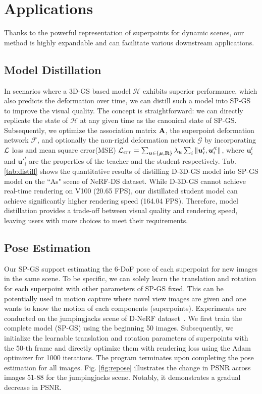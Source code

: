 \section{Applications}
Thanks to the powerful representation of superpoints for dynamic scenes, our method is highly expandable and can facilitate various downstream applications. 
\subsection{Model Distillation}
In scenarios where a 3D-GS based model $\mathcal{H}$ exhibits superior performance, which also predicts the deformation over time, we can distill such a model into SP-GS to improve the visual quality.
The concept is straightforward: we can directly replicate the state of $\mathcal{H}$ at any given time as the canonical state of SP-GS. 
Subsequently, we optimize the association matrix $\mathbf{A}$, the superpoint deformation network $\mathcal{F}$, and optionally the non-rigid deformation network $\mathcal{G}$ by incorporating $\mathcal{L}$ loss and mean square error(MSE) $ \mathcal{L}_{err} =\sum_{\bm{u} \in \{\bm{\mu}, \mathbf{R} \}} \lambda_{\bm{u}} \sum_{i} \|\bm{u}^t_i, \bm{u}'^t_i \|$,
where $\bm{u}^t_i$  and $\bm{u}'^t_i$ are the properties of the teacher and the student respectively.
Tab. \ref{tab:distill} shows the quantitative results of distilling D-3D-GS model into SP-GS model on the ``As" scene of NeRF-DS dataset.
While D-3D-GS cannot achieve real-time rendering on V100 (20.65 FPS), our distillated student model can achieve significantly higher rendering speed (164.04 FPS). Therefore, model distillation provides a trade-off between visual quality and rendering speed, leaving users with more choices to meet their requirements.

\subsection{Pose Estimation}

Our SP-GS support estimating the 6-DoF pose of each superpoint for new images in the same scene.
To be specific, we can solely learn the translation and rotation for each superpoint with other parameters of SP-GS fixed. This can be potentially used in motion capture where novel view images are given and one wants to know the motion of each components (superpoints).
Experiments are conducted on the jumpingjacks scene of D-NeRF dataset~\cite{D-NeRF}. We first train the complete model (SP-GS) using the beginning 50 images. Subsequently, we initialize the learnable translation and rotation parameters of superpoints with the 50-th frame and directly optimize them with rendering loss using the Adam optimizer for 1000 iterations.
The program terminates upon completing the pose estimation for all images.
Fig. \ref{fig:repose} illustrates the change in PSNR across images 51-88 for the jumpingjacks scene.
Notably, it demonstrates a gradual decrease in PSNR.

